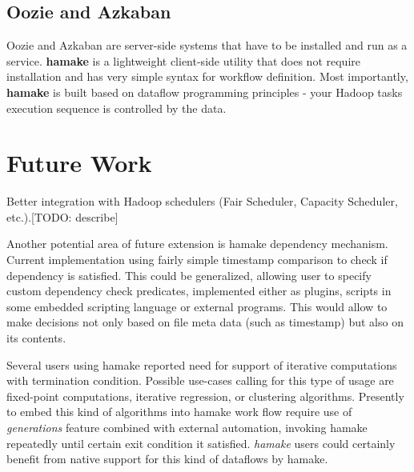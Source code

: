 \documentclass[10pt,conference,letterpaper]{IEEEtran}
\begin{document}
\subsection*{Oozie and Azkaban}

Oozie and Azkaban are server-side systems that have to be installed
and run as a service. \textbf{hamake} is a lightweight client-side
utility that does not require installation and has very simple syntax
for workflow definition.  Most importantly, \textbf{hamake} is built
based on dataflow programming principles - your Hadoop tasks execution
sequence is controlled by the data.
 

\section{Future Work}

Better integration with Hadoop schedulers (Fair Scheduler, Capacity
Scheduler, etc.).[TODO: describe]

Another potential area of future extension is hamake dependency
mechanism. Current implementation using fairly simple timestamp
comparison to check if dependency is satisfied. This could be
generalized, allowing user to specify custom dependency check
predicates, implemented either as plugins, scripts in some embedded
scripting language or external programs. This would allow to make
decisions not only based on file meta data (such as timestamp) but
also on its contents.

Several users using hamake reported need for support of iterative
computations with termination condition. Possible use-cases calling
for this type of usage are fixed-point computations, iterative
regression, or clustering algorithms. Presently to embed this kind of
algorithms into hamake work flow require use of \textit{generations}
feature combined with external automation, invoking hamake repeatedly
until certain exit condition it satisfied. \textit{hamake} users could
certainly benefit from native support for this kind of dataflows by
hamake.

\nocite{*}


\end{document}
